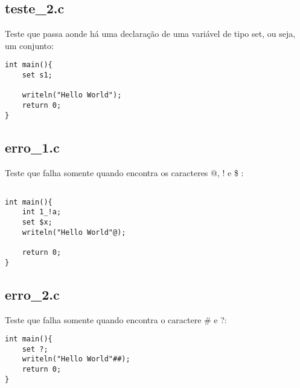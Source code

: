 \documentclass[runningheads]{llncs}
\begin{document}
\subsection{teste\_2.c}
Teste que passa aonde há uma declaração de uma variável de tipo set, ou seja, um conjunto:
\begin{lstlisting}[style=CStyle]
int main(){
    set s1;
    
    writeln("Hello World");
    return 0;
}\end{lstlisting}
\subsection{erro\_1.c}
Teste que falha somente quando encontra os caracteres @, ! e \$ :
\begin{lstlisting}[style=CStyle]

int main(){
    int 1_!a;
    set $x;
    writeln("Hello World"@);

    return 0;
}\end{lstlisting}

\subsection{erro\_2.c}
Teste que falha somente quando encontra o caractere \# e ?:
\begin{lstlisting}[style=CStyle]
int main(){
    set ?;
    writeln("Hello World"##);
    return 0;
}\end{lstlisting}
\end{document}

